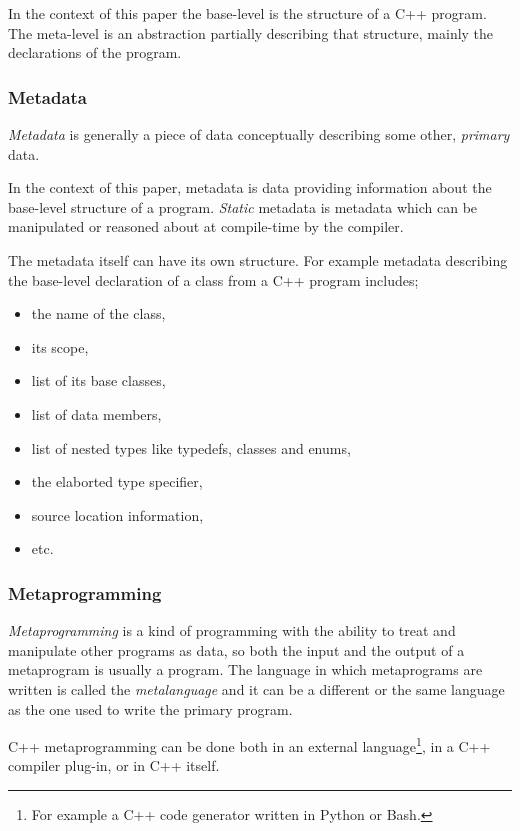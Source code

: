 In the context of this paper the base-level is the structure of a C++ program.
The meta-level is an abstraction partially describing that structure,
mainly the declarations of the program.

\subsubsection{Metadata}
\label{term-metadata}

{\em Metadata} is generally a piece of data conceptually describing some other,
{\em primary} data.

In the context of this paper, metadata is data providing information
about the base-level structure of a program.
{\em Static} metadata is metadata which can be manipulated or reasoned
about at compile-time by the compiler.

The metadata itself can have its own structure.
For example metadata describing the base-level declaration of a class 
from a C++ program includes;
\begin{itemize}
\item the name of the class,
\item its scope,
\item list of its base classes,
\item list of data members,
\item list of nested types like typedefs, classes and enums,
\item the elaborted type specifier,
\item source location information,
\item etc.
\end{itemize}

\subsubsection{Metaprogramming}

{\em Metaprogramming} is a kind of programming with the ability to treat and
manipulate other programs as data, so both the input and the output of
a metaprogram is usually a program. The language in which metaprograms
are written is called the {\em metalanguage} and it can be a different or the
same language as the one used to write the primary program.

C++ metaprogramming can be done both in an external language\footnote{For example a
C++ code generator written in Python or Bash.}, in a C++ compiler plug-in,
or in C++ itself. 

